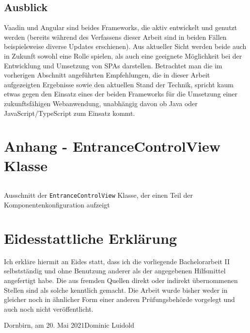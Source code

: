 \documentclass[a4paper,12pt,twoside]{scrreprt}
\begin{document}
\section{Ausblick}
\label{sec:ausblick}
Vaadin und Angular sind beides Frameworks, die aktiv entwickelt und genutzt werden (bereits während des Verfassens dieser Arbeit sind in beiden Fällen beispielsweise diverse Updates erschienen). Aus aktueller Sicht werden beide auch in Zukunft sowohl eine Rolle spielen, als auch eine geeignete Möglichkeit bei der Entwicklung und Umsetzung von \acp{SPA} darstellen. Betrachtet man die im vorherigen Abschnitt angeführten Empfehlungen, die in dieser Arbeit aufgezeigten Ergebnisse sowie den aktuellen Stand der Technik, spricht kaum etwas gegen den Einsatz eines der beiden Frameworks für die Umsetzung einer zukunftsfähigen Webanwendung, unabhängig davon ob Java oder JavaScript/TypeScript zum Einsatz kommt.

\clearpage
{}
{}
\printbibliography

\chapter*{Anhang - EntranceControlView Klasse}
\label{appendix:entrance-control-view-class}
\begin{listing}[H]
    \inputminted[fontsize=\footnotesize,linenos,breaklines]{java}{code/Luidold_Results-Vaadin-Components-CodeSample.java}
    \caption[Ausschnitt der \texttt{EntranceControlView} Klasse, der einen Teil der Komponentenkonfiguration aufzeigt]{Ausschnitt der \texttt{EntranceControlView} Klasse, der einen Teil der Komponentenkonfiguration aufzeigt}
    \label{code:results-vaadin-components}
\end{listing}

\chapter*{Eidesstattliche Erklärung}
Ich erkläre hiermit an Eides statt, dass ich die vorliegende Bachelorarbeit II selbstständig und ohne Benutzung anderer als der angegebenen Hilfsmittel angefertigt habe. Die aus fremden Quellen direkt oder indirekt übernommenen Stellen sind als solche kenntlich gemacht. Die Arbeit wurde bisher weder in gleicher noch in ähnlicher Form einer anderen Prüfungsbehörde vorgelegt und auch noch nicht veröffentlicht.

\vspace{5cm}
\noindent
Dornbirn, am 20. Mai 2021\hfill Dominic Luidold
\end{document}
